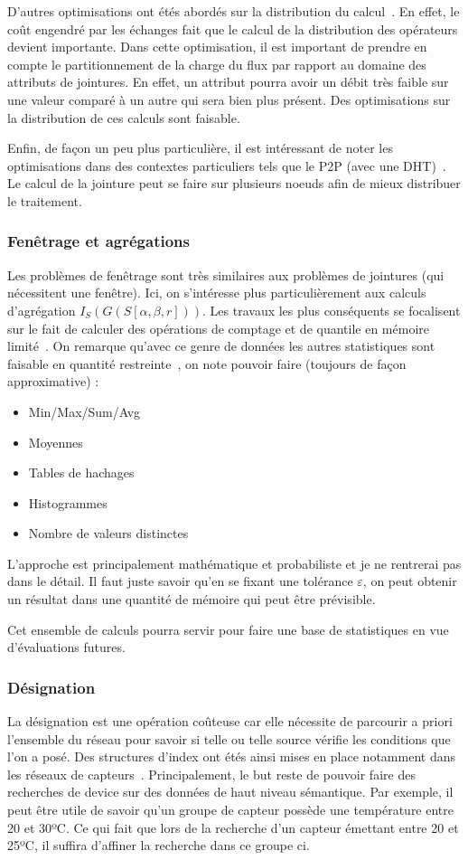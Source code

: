 D'autres optimisations ont étés abordés sur la distribution du calcul~\cite{Zhou:pmjoin}. En effet, le coût engendré par les échanges fait que le calcul de la distribution des opérateurs devient importante. Dans cette optimisation, il est important de prendre en compte le partitionnement de la charge du flux par rapport au domaine des attributs de jointures. En effet, un attribut pourra avoir un débit très faible sur une valeur comparé à un autre qui sera bien plus présent. Des optimisations sur la distribution de ces calculs sont faisable.

Enfin, de façon un peu plus particulière, il est intéressant de noter les optimisations dans des contextes particuliers tels que le P2P (avec une DHT)~\cite{Palma:p2p}. Le calcul de la jointure peut se faire sur plusieurs noeuds afin de mieux distribuer le traitement.

\subsubsection{Fenêtrage et agrégations}
Les problèmes de fenêtrage sont très similaires aux problèmes de jointures (qui nécessitent une fenêtre). Ici, on s'intéresse plus particulièrement aux calculs d'agrégation $I_S(G(S[\alpha,\beta,r]))$. Les travaux les plus conséquents se focalisent sur le fait de calculer des opérations de comptage et de quantile en mémoire limité~\cite{Arasu:window}. On remarque qu'avec ce genre de données les autres statistiques sont faisable en quantité restreinte~\cite{Datar:stats}, on note pouvoir faire (toujours de façon approximative) : 
\begin{itemize}
 \item Min/Max/Sum/Avg 
 \item Moyennes
 \item Tables de hachages
 \item Histogrammes
 \item Nombre de valeurs distinctes
\end{itemize}

L'approche est principalement mathématique et probabiliste et je ne rentrerai pas dans le détail. Il faut juste savoir qu'en se fixant une tolérance $\varepsilon$, on peut obtenir un résultat dans une quantité de mémoire qui peut être prévisible.

Cet ensemble de calculs pourra servir pour faire une base de statistiques en vue d'évaluations futures.
\subsubsection{Désignation}
La désignation est une opération coûteuse car elle nécessite de parcourir a priori l'ensemble du réseau pour savoir si telle ou telle source vérifie les conditions que l'on a posé. Des structures d'index ont étés ainsi mises en place notamment dans les réseaux de capteurs~\cite{Greenstein:difs}. Principalement, le but reste de pouvoir faire des recherches de device sur des données de haut niveau sémantique. Par exemple, il peut être utile de savoir qu'un groupe de capteur possède une température entre 20 et 30ºC. Ce qui fait que lors de la recherche d'un capteur émettant entre 20 et 25ºC, il suffira d'affiner la recherche dans ce groupe ci. 

